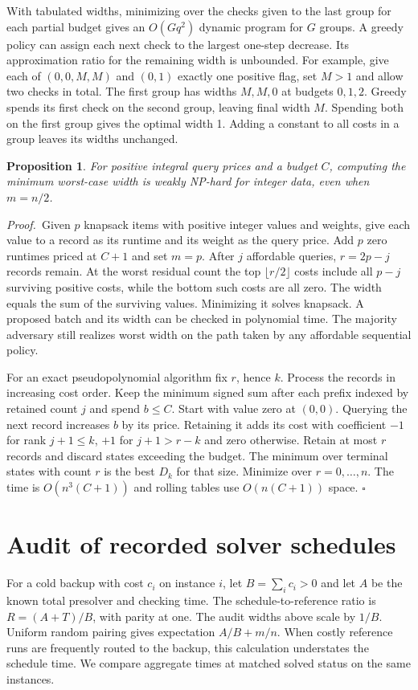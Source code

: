 \documentclass[final,5p,times,twocolumn]{elsarticle}
\newtheorem{proposition}[theorem]{Proposition}
\newcommand{\proofstart}{\noindent\textit{Proof.}\ }
\newcommand{\proofend}{\hfill$\square$\par}
\begin{document}
With tabulated widths, minimizing over the checks given to the last group for each partial budget gives an $O(Gq^2)$ dynamic program for $G$ groups. A greedy policy can assign each next check to the largest one-step decrease. Its approximation ratio for the remaining width is unbounded. For example, give each of $(0,0,M,M)$ and $(0,1)$ exactly one positive flag, set $M>1$ and allow two checks in total. The first group has widths $M,M,0$ at budgets $0,1,2$. Greedy spends its first check on the second group, leaving final width $M$. Spending both on the first group gives the optimal width 1. Adding a constant to all costs in a group leaves its widths unchanged.

\begin{proposition}
For positive integral query prices and a budget $C$, computing the minimum worst-case width is weakly NP-hard for integer data, even when $m=n/2$.
\end{proposition}
\proofstart Given $p$ knapsack items with positive integer values and weights, give each value to a record as its runtime and its weight as the query price. Add $p$ zero runtimes priced at $C+1$ and set $m=p$. After $j$ affordable queries, $r=2p-j$ records remain. At the worst residual count the top $\lfloor r/2\rfloor$ costs include all $p-j$ surviving positive costs, while the bottom such costs are all zero. The width equals the sum of the surviving values. Minimizing it solves knapsack. A proposed batch and its width can be checked in polynomial time. The majority adversary still realizes worst width on the path taken by any affordable sequential policy.

For an exact pseudopolynomial algorithm fix $r$, hence $k$. Process the records in increasing cost order. Keep the minimum signed sum after each prefix indexed by retained count $j$ and spend $b\leq C$. Start with value zero at $(0,0)$. Querying the next record increases $b$ by its price. Retaining it adds its cost with coefficient $-1$ for rank $j+1\leq k$, $+1$ for $j+1>r-k$ and zero otherwise. Retain at most $r$ records and discard states exceeding the budget. The minimum over terminal states with count $r$ is the best $D_k$ for that size. Minimize over $r=0,\ldots,n$. The time is $O(n^3(C+1))$ and rolling tables use $O(n(C+1))$ space. \proofend

\section{Audit of recorded solver schedules}
For a cold backup with cost $c_i$ on instance $i$, let $B=\sum_i c_i>0$ and let $A$ be the known total presolver and checking time. The schedule-to-reference ratio is $R=(A+T)/B$, with parity at one. The audit widths above scale by $1/B$. Uniform random pairing gives expectation $A/B+m/n$. When costly reference runs are frequently routed to the backup, this calculation understates the schedule time. We compare aggregate times at matched solved status on the same instances.
\end{document}
